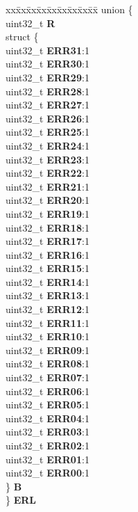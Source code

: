 \begin{DoxyCompactItemize}
\begin{tabbing}
\end{tabbing}\item 
\mbox{\label{structEDMA__tag_ab9abd0add68b7508a0bb9c7eb295420e}} 
\begin{tabbing}
xx\=xx\=xx\=xx\=xx\=xx\=xx\=xx\=xx\=\kill
union \{\\
\>uint32\_t {\bfseries R}\\
\>struct \{\\
\>\>uint32\_t {\bfseries ERR31}:1\\
\>\>uint32\_t {\bfseries ERR30}:1\\
\>\>uint32\_t {\bfseries ERR29}:1\\
\>\>uint32\_t {\bfseries ERR28}:1\\
\>\>uint32\_t {\bfseries ERR27}:1\\
\>\>uint32\_t {\bfseries ERR26}:1\\
\>\>uint32\_t {\bfseries ERR25}:1\\
\>\>uint32\_t {\bfseries ERR24}:1\\
\>\>uint32\_t {\bfseries ERR23}:1\\
\>\>uint32\_t {\bfseries ERR22}:1\\
\>\>uint32\_t {\bfseries ERR21}:1\\
\>\>uint32\_t {\bfseries ERR20}:1\\
\>\>uint32\_t {\bfseries ERR19}:1\\
\>\>uint32\_t {\bfseries ERR18}:1\\
\>\>uint32\_t {\bfseries ERR17}:1\\
\>\>uint32\_t {\bfseries ERR16}:1\\
\>\>uint32\_t {\bfseries ERR15}:1\\
\>\>uint32\_t {\bfseries ERR14}:1\\
\>\>uint32\_t {\bfseries ERR13}:1\\
\>\>uint32\_t {\bfseries ERR12}:1\\
\>\>uint32\_t {\bfseries ERR11}:1\\
\>\>uint32\_t {\bfseries ERR10}:1\\
\>\>uint32\_t {\bfseries ERR09}:1\\
\>\>uint32\_t {\bfseries ERR08}:1\\
\>\>uint32\_t {\bfseries ERR07}:1\\
\>\>uint32\_t {\bfseries ERR06}:1\\
\>\>uint32\_t {\bfseries ERR05}:1\\
\>\>uint32\_t {\bfseries ERR04}:1\\
\>\>uint32\_t {\bfseries ERR03}:1\\
\>\>uint32\_t {\bfseries ERR02}:1\\
\>\>uint32\_t {\bfseries ERR01}:1\\
\>\>uint32\_t {\bfseries ERR00}:1\\
\>\} {\bfseries B}\\
\} {\bfseries ERL}\\


\end{tabbing}
\end{DoxyCompactItemize}
